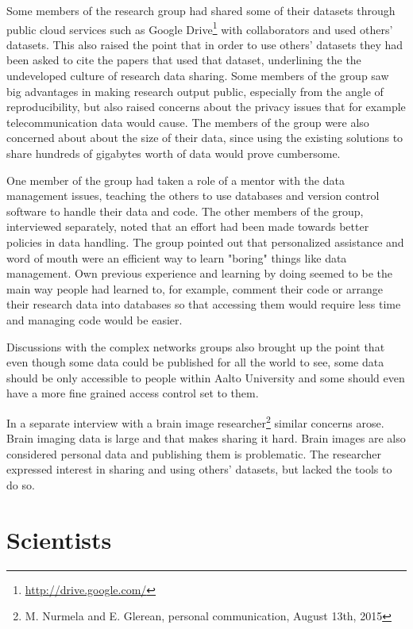 Some members of the research group had shared some of their datasets through
public cloud services such as Google Drive\footnote{\url{http://drive.google.com/}}
with collaborators and used others' datasets. This also raised the point that
in order to use others' datasets they had been asked to cite the papers that
used that dataset, underlining the the undeveloped culture of research data
sharing. Some members of the group saw big advantages in making research output
public, especially from the angle of reproducibility, but also raised concerns
about the privacy issues that for example telecommunication data would cause.
The members of the group were also concerned about about the size of their
data, since using the existing solutions to share hundreds of gigabytes worth
of data would prove cumbersome.

One member of the group had taken a role of a mentor with the data management
issues, teaching the others to use databases and version control software to
handle their data and code. The other members of the group, interviewed
separately, noted that an effort had been made towards better policies in data
handling. The group pointed out that personalized assistance and word of mouth
were an efficient way to learn "boring" things like data management. Own
previous experience and learning by doing seemed to be the main way people had
learned to, for example, comment their code or arrange their research data into
databases so that accessing them would require less time and managing code
would be easier.

Discussions with the complex networks groups also brought up the point that
even though some data could be published for all the world to see, some data
should be only accessible to people within Aalto University and some should
even have a more fine grained access control set to them.

In a separate interview with a brain image researcher\footnote{M. Nurmela and
E. Glerean, personal communication, August 13th, 2015} similar concerns arose.
Brain imaging data is large and that makes sharing it hard. Brain images are
also considered personal data and publishing them is problematic. The
researcher expressed interest in sharing and using others' datasets, but
lacked the tools to do so.

\iffalse
\section{Scientists}

